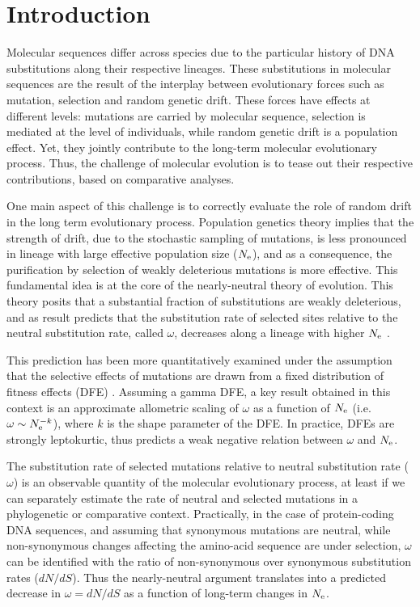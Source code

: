 \documentclass{MBE}%
\begin{document}
\maketitle

\section*{Introduction}
Molecular sequences differ across species due to the particular history of DNA substitutions along their respective lineages.
These substitutions in molecular sequences are the result of the interplay between evolutionary forces such as mutation, selection and random genetic drift.
These forces have effects at different levels: mutations are carried by molecular sequence, selection is mediated at the level of individuals, while random genetic drift is a population effect.
Yet, they jointly contribute to the long-term molecular evolutionary process.
Thus, the challenge of molecular evolution is to tease out their respective contributions, based on comparative analyses.

One main aspect of this challenge is to correctly evaluate the role of random drift in the long term evolutionary process.
Population genetics theory implies that the strength of drift, due to the stochastic sampling of mutations, is less pronounced in lineage with large effective population size ($N_{\mathrm{e}}$), and as a consequence, the purification by selection of weakly deleterious mutations is more effective.
This fundamental idea is at the core of the nearly-neutral theory of evolution.
This theory posits that a substantial fraction of substitutions are weakly deleterious, and as result predicts that the substitution rate of selected sites relative to the neutral substitution rate, called $\omega$, decreases along a lineage with higher $N_{\mathrm{e}}$ \citep{Ohta1972, Ohta1992}.

This prediction has been more quantitatively examined under the assumption that the selective effects of mutations are drawn from a fixed distribution of fitness effects (DFE) \citep{Kimura1979, Welch2008}.
Assuming a gamma DFE, a key result obtained in this context is an approximate allometric scaling of $\omega$ as a function of $N_{\mathrm{e}}$ (i.e. $\omega \sim N_{\mathrm{e}}^{-k}$), where $k$ is the shape parameter of the DFE.
In practice, DFEs are strongly leptokurtic, thus predicts a weak negative relation between $\omega$ and $N_{\mathrm{e}}$.

The substitution rate of selected mutations relative to neutral substitution rate ($\omega$) is an observable quantity of the molecular evolutionary process, at least if we can separately estimate the rate of neutral and selected mutations in a phylogenetic or comparative context.
Practically, in the case of protein-coding DNA sequences, and assuming that synonymous mutations are neutral, while non-synonymous changes affecting the amino-acid sequence are under selection, $\omega$ can be identified with the ratio of non-synonymous over synonymous substitution rates ($dN/dS$).
Thus the nearly-neutral argument translates into a predicted decrease in $\omega = dN/dS$ as a function of long-term changes in $N_{\mathrm{e}}$.
\end{document}
